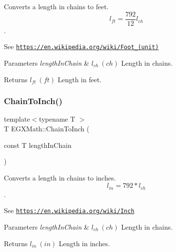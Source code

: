 Converts a length in chains to feet. \[ l_{ft}= \frac{792}{12} l_{ch} \]. 

See \href{https://en.wikipedia.org/wiki/Foot_(unit)}{\tt https\+://en.\+wikipedia.\+org/wiki/\+Foot\+\_\+(unit)} 
\begin{DoxyParams}{Parameters}
{\em length\+In\+Chain} & $ l_{ch}\ (ch)$ Length in chains. \\
\hline
\end{DoxyParams}
\begin{DoxyReturn}{Returns}
$ l_{ft}\ (ft)$ Length in feet. 
\end{DoxyReturn}
\mbox{\label{group___e_g_x_math-_conversions-_length_conversions-_imperial-_chain-_imperial_gabbb970d9c4833232722a01a846c30bc8}} 
\subsubsection{\texorpdfstring{Chain\+To\+Inch()}{ChainToInch()}}
{\footnotesize\ttfamily template$<$typename T $>$ \\
T E\+G\+X\+Math\+::\+Chain\+To\+Inch (\begin{DoxyParamCaption}\item[{const T}]{length\+In\+Chain }\end{DoxyParamCaption})}



Converts a length in chains to inches. \[ l_{in}= 792 * l_{ch} \]. 

See \href{https://en.wikipedia.org/wiki/Inch}{\tt https\+://en.\+wikipedia.\+org/wiki/\+Inch} 
\begin{DoxyParams}{Parameters}
{\em length\+In\+Chain} & $ l_{ch}\ (ch)$ Length in chains. \\
\hline
\end{DoxyParams}
\begin{DoxyReturn}{Returns}
$ l_{in}\ (in)$ Length in inches. 
\end{DoxyReturn}
\mbox{\label{group___e_g_x_math-_conversions-_length_conversions-_imperial-_chain-_imperial_gae1276611dce26e23deae1b0379b4394d}} 
